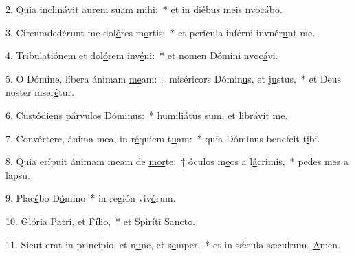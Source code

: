 2. Quia inclinávit aurem s\uline{u}am m\uline{i}hi:~* et in diébus meis nvoc\uline{á}bo.\par 
3. Circumdedérunt me dol\uline{ó}res m\uline{o}rtis:~* et perícula inférni invnér\uline{u}nt me.\par 
4. Tribulatiónem et dol\uline{ó}rem inv\uline{é}ni:~* et nomen Dómini nvoc\uline{á}vi.\par 
5. O Dómine, líbera ánimam \uline{me}am:~† miséricors Dómin\uline{u}s, et j\uline{u}stus,~* et Deus noster mser\uline{é}tur.\par 
6. Custódiens p\uline{á}rvulos D\uline{ó}minus:~* humiliátus sum, et libráv\uline{i}t me.\par 
7. Convértere, ánima mea, in r\uline{é}quiem t\uline{u}am:~* quia Dóminus benefcit t\uline{i}bi.\par 
8. Quia erípuit ánimam meam de \uline{mor}te:~† óculos m\uline{e}os a l\uline{á}crimis,~* pedes mes a l\uline{a}psu.\par 
9. Plac\uline{é}bo D\uline{ó}mino~* in región viv\uline{ó}rum.\par 
10. Glória P\uline{a}tri, et F\uline{í}lio,~* et Spiríti S\uline{a}ncto.\par 
11. Sicut erat in princípio, et n\uline{u}nc, et s\uline{e}mper,~* et in sǽcula sæculrum. \uline{A}men.\par 
